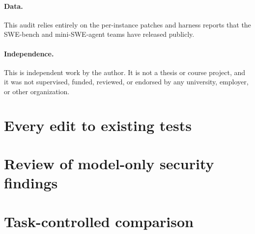 \documentclass[10pt]{article}
\begin{document}
\paragraph{Data.} This audit relies entirely on the per-instance patches and harness reports that the SWE-bench and mini-SWE-agent teams have released publicly.

\paragraph{Independence.} This is independent work by the author. It is not a thesis or course project, and it was not supervised, funded, reviewed, or endorsed by any university, employer, or other organization.




\clearpage
\appendix

\section{Every edit to existing tests}\label{app:tests}
\begin{table}[H]
\centering
\small

\caption{All \NTestEdits{} model patches that edit pre-existing test files. \emph{Overlap}: share of the test lines removed by the model that are also removed by the official test patch. $^\dagger$Edits a test file outside the official test patch: it persists in the repository but is not run by the harness.}
\end{table}

\section{Review of model-only security findings}\label{app:triage}
\begin{table}[H]
\centering
\small

\caption{All distinct flagged lines introduced by a model patch where the human fix for the same instance does not trigger the same rule. Rationales for each label are in \texttt{data/triage/security\_model\_only.csv}.}
\end{table}

\section{Task-controlled comparison}\label{app:paired}
\begin{table}[H]
\centering
\small

\caption{For each model, instances it resolved paired with the human fix for the same instance. \emph{Model only} and \emph{Human only} count discordant pairs in which only one side has a new security finding; $p$ is a two-sided exact binomial test on the discordant pairs.}
\end{table}
\end{document}
